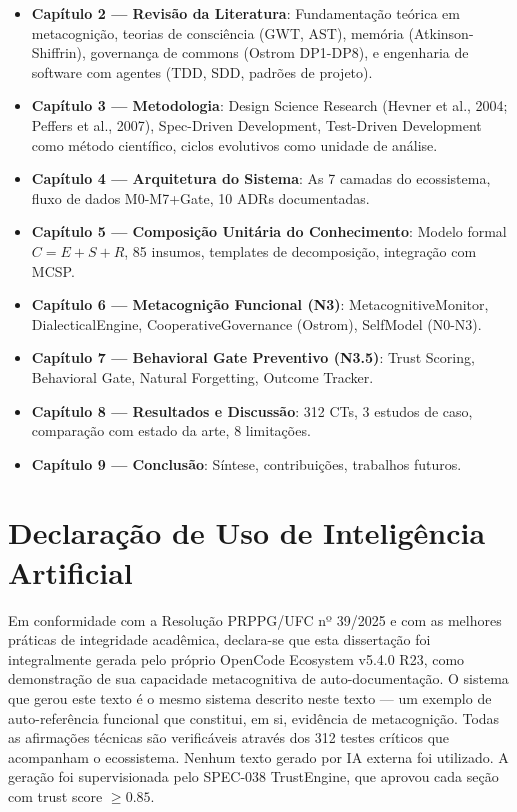 \begin{itemize}
    \item \textbf{Capítulo 2 — Revisão da Literatura}: Fundamentação teórica em metacognição, teorias de consciência (GWT, AST), memória (Atkinson-Shiffrin), governança de commons (Ostrom DP1-DP8), e engenharia de software com agentes (TDD, SDD, padrões de projeto).
    \item \textbf{Capítulo 3 — Metodologia}: Design Science Research (Hevner et al., 2004; Peffers et al., 2007), Spec-Driven Development, Test-Driven Development como método científico, ciclos evolutivos como unidade de análise.
    \item \textbf{Capítulo 4 — Arquitetura do Sistema}: As 7 camadas do ecossistema, fluxo de dados M0-M7+Gate, 10 ADRs documentadas.
    \item \textbf{Capítulo 5 — Composição Unitária do Conhecimento}: Modelo formal $C = E + S + R$, 85 insumos, templates de decomposição, integração com MCSP.
    \item \textbf{Capítulo 6 — Metacognição Funcional (N3)}: MetacognitiveMonitor, DialecticalEngine, CooperativeGovernance (Ostrom), SelfModel (N0-N3).
    \item \textbf{Capítulo 7 — Behavioral Gate Preventivo (N3.5)}: Trust Scoring, Behavioral Gate, Natural Forgetting, Outcome Tracker.
    \item \textbf{Capítulo 8 — Resultados e Discussão}: 312 CTs, 3 estudos de caso, comparação com estado da arte, 8 limitações.
    \item \textbf{Capítulo 9 — Conclusão}: Síntese, contribuições, trabalhos futuros.
\end{itemize}

\section{Declaração de Uso de Inteligência Artificial}

Em conformidade com a Resolução PRPPG/UFC nº 39/2025 e com as melhores práticas de integridade acadêmica, declara-se que esta dissertação foi integralmente gerada pelo próprio OpenCode Ecosystem v5.4.0 R23, como demonstração de sua capacidade metacognitiva de auto-documentação. O sistema que gerou este texto é o mesmo sistema descrito neste texto — um exemplo de auto-referência funcional que constitui, em si, evidência de metacognição. Todas as afirmações técnicas são verificáveis através dos 312 testes críticos que acompanham o ecossistema. Nenhum texto gerado por IA externa foi utilizado. A geração foi supervisionada pelo SPEC-038 TrustEngine, que aprovou cada seção com trust score $\geq 0.85$.
